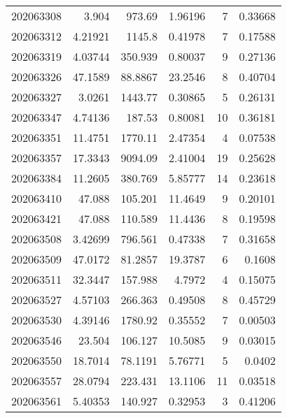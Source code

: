 \begin{tabular}{rrrrrr}
 202063308 &          3.904   &      973.69   &            1.96196 &           7 & 0.33668 \\
 202063312 &          4.21921 &     1145.8    &            0.41978 &           7 & 0.17588 \\
 202063319 &          4.03744 &      350.939  &            0.80037 &           9 & 0.27136 \\
 202063326 &         47.1589  &       88.8867 &           23.2546  &           8 & 0.40704 \\
 202063327 &          3.0261  &     1443.77   &            0.30865 &           5 & 0.26131 \\
 202063347 &          4.74136 &      187.53   &            0.80081 &          10 & 0.36181 \\
 202063351 &         11.4751  &     1770.11   &            2.47354 &           4 & 0.07538 \\
 202063357 &         17.3343  &     9094.09   &            2.41004 &          19 & 0.25628 \\
 202063384 &         11.2605  &      380.769  &            5.85777 &          14 & 0.23618 \\
 202063410 &         47.088   &      105.201  &           11.4649  &           9 & 0.20101 \\
 202063421 &         47.088   &      110.589  &           11.4436  &           8 & 0.19598 \\
 202063508 &          3.42699 &      796.561  &            0.47338 &           7 & 0.31658 \\
 202063509 &         47.0172  &       81.2857 &           19.3787  &           6 & 0.1608  \\
 202063511 &         32.3447  &      157.988  &            4.7972  &           4 & 0.15075 \\
 202063527 &          4.57103 &      266.363  &            0.49508 &           8 & 0.45729 \\
 202063530 &          4.39146 &     1780.92   &            0.35552 &           7 & 0.00503 \\
 202063546 &         23.504   &      106.127  &           10.5085  &           9 & 0.03015 \\
 202063550 &         18.7014  &       78.1191 &            5.76771 &           5 & 0.0402  \\
 202063557 &         28.0794  &      223.431  &           13.1106  &          11 & 0.03518 \\
 202063561 &          5.40353 &      140.927  &            0.32953 &           3 & 0.41206 \\

\end{tabular}
